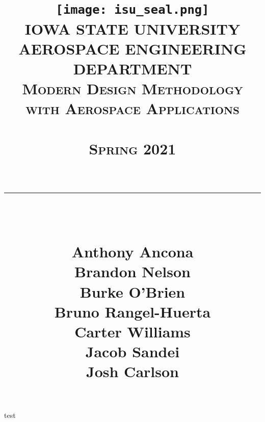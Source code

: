 \documentclass{article}
\title{
	\centering
	\vspace*{0.25 cm}
	\texttt{[image: isu\_seal.png]}\\[0.75 cm]	%
	\textsc{\LARGE IOWA STATE UNIVERSITY}\\[.75 cm]
	\textsc{\large AEROSPACE ENGINEERING DEPARTMENT}\\[0.2 cm]
	\textsc{\large Modern Design Methodology with Aerospace Applications}\\[0.2 cm]
	\textsc{\Large \hmwkClass}\\[0.5 cm]				%
	\textsc{\Large Spring 2021}\\[0.5 cm]				%
	\textsc{\Large \hmwkTitle}\\[0.2 cm]
	\rule{\linewidth}{0.2 mm} \\ [0.25 cm]
		\begin{minipage}{0.8\textwidth}
		\begin{flushleft}
		Anthony Ancona\\Brandon Nelson\\Burke O'Brien\\Bruno Rangel-Huerta\\Carter Williams\\Jacob Sandei\\Josh Carlson
		\end{flushleft}
		\end{minipage}
}
\author{\hmwkAuthorName}
\date{}
\begin{document}
\maketitle
\pagebreak
test
\end{document}
